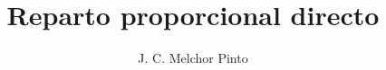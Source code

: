 \documentclass[12pt]{guia}
\title{Reparto proporcional directo}
\author{J. C. Melchor Pinto}
\begin{document}
\pagestyle{headandfoot}
\addpoints
\INFO
\begin{questions}
    
    
    \newpage
    
\end{questions}

\end{document}
